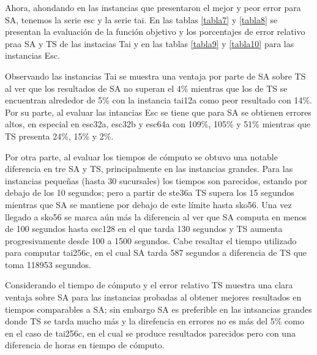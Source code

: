 \documentclass{ci5652}
\begin{document}
Ahora, ahondando en las instancias que presentaron el mejor y peor error para SA, tenemos la serie esc y la serie tai. En las tablas \ref{tabla7} y \ref{tabla8} se presentan la evaluación de la función objetivo y los porcentajes de error relativo praa SA y TS de las instacias Tai y en las tablas \ref{tabla9} y \ref{tabla10} para las instancias Esc.

Observando las instancias Tai se muestra una ventaja por parte de SA sobre TS al ver que los resultados de SA no superan el 4\% mientras que los de TS se encuentran alrededor de 5\% con la instancia tai12a como peor resultado con 14\%. Por su parte, al evaluar las intancias Esc se tiene que para SA se obtienen errores altos, en especial en esc32a, esc32b y esc64a con 109\%, 105\% y 51\% mientras que TS presenta 24\%, 15\% y 2\%.

Por otra parte, al evaluar los tiempos de cómputo se obtuvo una notable diferencia en tre SA y TS, principalmente en las instancias grandes. Para las instancias pequeñas (hasta 30 sucursales) los tiempos son parecidos, estando por debajo de los 10 segundos; pero a partir de ste36a TS supera los 15 segundos mientras que SA se mantiene por debajo de este límite hasta sko56. Una vez llegado a sko56 se marca aún más la diferencia al ver que SA computa en menos de 100 segundos hasta esc128 en el que tarda 130 segundos y TS aumenta progresivamente desde 100 a 1500 segundos. Cabe resaltar el tiempo utilizado para computar tai256c, en el cual SA tarda 587 segundos a diferencia de TS que toma 118953 segundos.

Considerando el tiempo de cómputo y el error relativo TS muestra una clara ventaja sobre SA para las instancias probadas al obtener mejores resultados en tiempos comparables a SA; sin embargo SA es preferible en las intsancias grandes donde TS se tarda mucho más y la direfencia en errores no es más del 5\% como en el caso de tai256c, en el cual se produce resultados parecidos pero con una diferencia de horas en tiempo de cómputo.                              

\begin{table}
\end{table}

\begin{table}
\end{table}
\end{document}
